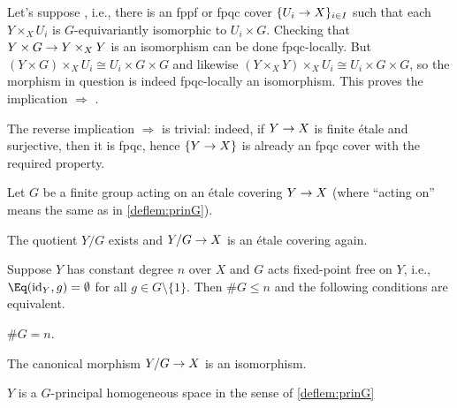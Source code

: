 \begin{proof*}
	Let's suppose , i.e., there is an fppf or fpqc cover $\{U_i\morphism X\}_{i\in I}$ such that each $Y\times_XU_i$ is $G$-equivariantly isomorphic to $U_i\times G$. Checking that $Y\times G\morphism Y\times_XY$ is an isomorphism can be done fpqc-locally. But $(Y\times G)\times_XU_i\cong U_i\times G\times G$ and likewise $(Y\times_XY)\times_XU_i\cong U_i\times G\times G$, so the morphism in question is indeed fpqc-locally an isomorphism. This proves the implication  $\Rightarrow$ .
	
	The reverse implication  $\Rightarrow$  is trivial: indeed, if $Y\morphism X$ is finite étale and surjective, then it is fpqc, hence $\{Y\morphism X\}$ is already an fpqc cover with the required property.
\end{proof*}
\begin{prop}\label{prop:Galois}
	Let $G$ be a finite group acting on an étale covering $Y\morphism X$ (where \enquote{acting on} means the same as in \cref{deflem:prinG}).
	\begin{alphanumerate}
		\item The quotient $Y/G$ exists and $Y/G\morphism X$ is an étale covering again.
		\item Suppose $Y$ has constant degree $n$ over $X$ and $G$ acts fixed-point free on $Y$, i.e., $\Eq(\id_Y,g)=\emptyset$ for all $g\in G\setminus\{1\}$. Then $\# G\leq n$ and the following conditions are equivalent.
		\begin{numerate}
			\item $\# G=n$.
			\item The canonical morphism $Y/G\morphism X$ is an isomorphism.
			\item $Y$ is a $G$-principal homogeneous space in the sense of \cref{deflem:prinG}
		\end{numerate}
	\end{alphanumerate}
\end{prop}
